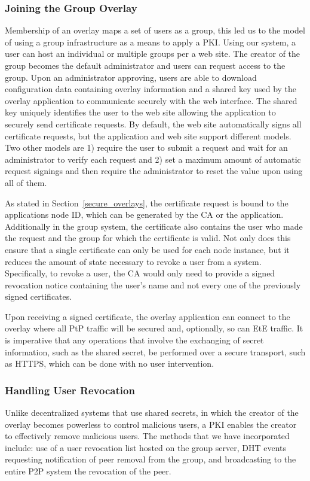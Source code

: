 \documentclass[conference]{IEEEtran}
\begin{document}
\subsubsection{Joining the Group Overlay}
Membership of an overlay maps a set of users as a group, this led us to the
model of using a group infrastructure as a means to apply a PKI.  Using our
system, a user can host an individual or multiple groups per a web site.  The
creator of the group becomes the default administrator and users can request
access to the group.  Upon an administrator approving, users are able to
download configuration data containing overlay information and a shared key
used by the overlay application to communicate securely with the web interface.
The shared key uniquely identifies the user to the web site allowing the
application to securely send certificate requests.  By default, the web site
automatically signs all certificate requests, but the application and web site
support different models.  Two other models are 1) require the user to
submit a request and wait for an administrator to verify each request and 2)
set a maximum amount of automatic request signings and then require the 
administrator to reset the value upon using all of them.

As stated in Section~\ref{secure_overlays}, the certificate request is bound
to the applications node ID, which can be generated by the CA or the
application.  Additionally in the group system, the certificate also contains
the user who made the request and the group for which the certificate is valid.
Not only does this ensure that a single certificate can only be used for each
node instance, but it reduces the amount of state necessary to revoke a user
from a system.  Specifically, to revoke a user, the CA would only need to
provide a signed revocation notice containing the user's name and not every one
of the previously signed certificates.

Upon receiving a signed certificate, the overlay application can connect to the
overlay where all PtP traffic will be secured and, optionally, so can EtE
traffic.  It is imperative that any operations that involve the exchanging of
secret information, such as the shared secret, be performed over a secure
transport, such as HTTPS, which can be done with no user intervention.

\subsubsection{Handling User Revocation}
Unlike decentralized systems that use shared secrets, in which the creator of
the overlay becomes powerless to control malicious users, a PKI enables the
creator to effectively remove malicious users.  The methods that we have
incorporated include:  use of a user revocation list hosted on the group server,
DHT events requesting notification of peer removal from the group, and
broadcasting to the entire P2P system the revocation of the peer.
\end{document}
